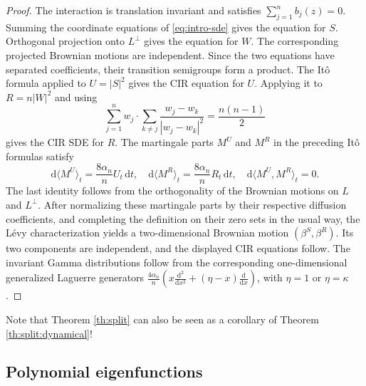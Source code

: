 \documentclass[11pt,reqno]{amsart}
\numberwithin{equation}{section}%
\numberwithin{figure}{section}%
\numberwithin{table}{section}
\theoremstyle{plain}
\theoremstyle{definition}
\begin{document}
\begin{proof}
  The interaction is translation invariant and satisfies
  $\sum_{j=1}^n b_j(z)=0$. Summing the coordinate equations of
  \eqref{eq:intro-sde} gives the equation for $S$. Orthogonal projection onto
  $L^\perp$ gives the equation for $W$. The corresponding projected Brownian
  motions are independent. Since the two equations have separated
  coefficients, their transition semigroups form a product. The Itô formula
  applied to $U=|S|^2$ gives the CIR equation for $U$. Applying it to
  $R=n|W|^2$ and using
  \[
    \sum_{j=1}^n
    w_j\cdot
    \sum_{k\neq j}\frac{w_j-w_k}{|w_j-w_k|^2}
    =
    \frac{n(n-1)}{2}
  \]
  gives the CIR SDE for $R$. The martingale parts $M^U$ and $M^R$ in the
  preceding Itô formulas satisfy
  \[
    \mathrm{d}\langle M^U\rangle_t = \frac{8\alpha_n}{n}U_t\,\mathrm{d}t,
    \quad
    \mathrm{d}\langle M^R\rangle_t = \frac{8\alpha_n}{n}R_t\,\mathrm{d}t,
    \quad
    \mathrm{d}\langle M^U,M^R\rangle_t=0.
  \]
  The last identity follows from the orthogonality of the Brownian motions on
  $L$ and $L^\perp$. After normalizing these martingale parts by their
  respective diffusion coefficients, and completing the definition on their
  zero sets in the usual way, the Lévy characterization yields a
  two-dimensional Brownian motion $(\beta^S,\beta^R)$. Its two components are
  independent, and the displayed CIR equations follow.
  The invariant Gamma distributions follow from the corresponding
  one-dimensional generalized Laguerre generators
  $\frac{4\alpha_n}{n}\left(x\frac{\mathrm{d}^2}{\mathrm{d}x^2}+(\eta-x)\frac{\mathrm{d}}{\mathrm{d}x}\right)$,
  with $\eta=1$ or $\eta=\kappa$.
\end{proof}

Note that Theorem \ref{th:split} can also be seen as a corollary of Theorem \ref{th:split:dynamical}!

\subsection{Polynomial eigenfunctions}
\end{document}
